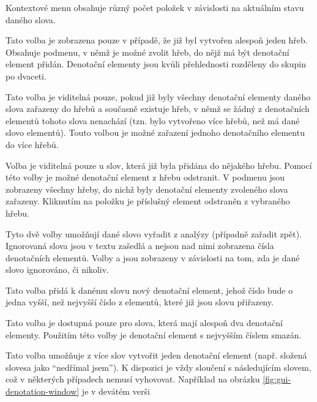 \documentclass[dp.tex]{subfiles}
\begin{document}
Kontextové menu obsahuje různý počet položek v závislosti na aktuálním stavu daného slova. 

\begin{description}[style=nextline]
	\item[\keys{Přidat do hřebu $\kern 10pt\triangleright$}] Tato volba je zobrazena pouze v případě, že již byl vytvořen alespoň jeden hřeb. Obsahuje podmenu, v němž je možné zvolit hřeb, do nějž má být denotační element přidán. Denotační elementy jsou kvůli přehlednosti rozděleny do skupin po dvaceti.

	\item[\keys{Přidat do jiného hřebu}] Tato volba je viditelná pouze, pokud již byly všechny denotační elementy daného slova zařazeny do hřebů a současně existuje hřeb, v němž se žádný z denotačních elementů tohoto slova nenachází (tzn. bylo vytvořeno více hřebů, než má dané slovo elementů). Touto volbou je možné zařazení jednoho denotačního elementu do více hřebů.

	\item[\keys{Odebrat z hřebu $\kern 10pt\triangleright$}] Volba je viditelná pouze u slov, která již byla přidána do nějakého hřebu. Pomocí této volby je možné denotační element z hřebu odstranit. V podmenu jsou zobrazeny všechny hřeby, do nichž byly denotační elementy zvoleného slova zařazeny. Kliknutím na položku je příslušný element odstraněn z vybraného hřebu.

	\item[\keys{Ignorovat} / \keys{Brát v potaz}] Tyto dvě volby umožňují dané slovo vyřadit z analýzy (případně zařadit zpět). Ignorovaná slova jsou v textu zašedlá a nejsou nad nimi zobrazena čísla denotačních elementů. Volby  a  jsou zobrazeny v závislosti na tom, zda je dané slovo  ignorováno, či nikoliv.

	\item[\keys{Přidat denotační element}] Tato volba přidá k danému slovu nový denotační element, jehož číslo bude o jedna vyšší, než nejvyšší číslo z elementů, které již jsou slovu přiřazeny. 

	\item[\keys{Odebrat denotační element}] Tato volba je dostupná pouze pro slova, která mají alespoň dva denotační elementy. Použitím této volby je denotační element s nejvyšším číslem smazán.

	\item[\keys{Sloučit s [\ldots]}] Tato volba umožňuje z více slov vytvořit jeden denotační element (např. složená slovesa jako \enquote{nedřímal jsem}). K dispozici je vždy sloučení s následujícím slovem, což v některých případech nemusí vyhovovat. Například na obrázku \ref{fig:gui-denotation-window} je v devátém verši


\end{description}
\end{document}

